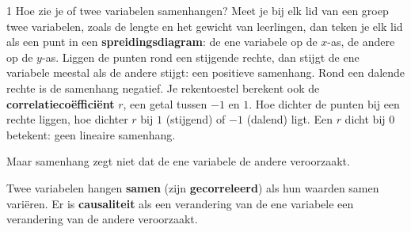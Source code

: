 \begin{alleenvoor}{1}
Hoe zie je of twee variabelen samenhangen? Meet je bij elk lid van een groep twee variabelen, zoals de lengte en het gewicht van leerlingen, dan teken je elk lid als een punt in een \textbf{spreidingsdiagram}: de ene variabele op de $x$-as, de andere op de $y$-as. Liggen de punten rond een stijgende rechte, dan stijgt de ene variabele meestal als de andere stijgt: een positieve samenhang. Rond een dalende rechte is de samenhang negatief. Je rekentoestel berekent ook de \textbf{correlatiecoëfficiënt} $r$, een getal tussen $-1$ en $1$. Hoe dichter de punten bij een rechte liggen, hoe dichter $r$ bij $1$ (stijgend) of $-1$ (dalend) ligt. Een $r$ dicht bij 0 betekent: geen lineaire samenhang.


Maar samenhang zegt niet dat de ene variabele de andere veroorzaakt.
\end{alleenvoor}

\begin{theorie}
Twee variabelen hangen \textbf{\textcolor{accent}{samen}} (zijn \textbf{\textcolor{accent}{gecorreleerd}}) als hun waarden samen variëren. Er is \textbf{\textcolor{accent}{causaliteit}} als een verandering van de ene variabele een verandering van de andere veroorzaakt.
\end{theorie}

